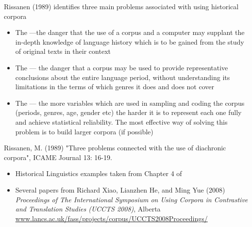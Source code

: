 \documentclass[a4paper,landscape,headrule,footrule,dvips]{foils}
\begin{document}
\begin{CJK}{UTF8}{min}
\MyLogo{}
Rissanen (1989) identifies three main problems associated with using historical corpora
\begin{itemize}
\item The  ---the danger that the use of a corpus and a computer may supplant the in-depth knowledge of language history which is to be gained from the study of original texts in their context
\item  The  --- the danger that a corpus may be used to provide representative conclusions about the entire language period, without understanding its limitations in the terms of which genres it does and does not cover
\item The  --- the more variables which are used in sampling and coding the corpus (periods, genres, age, gender etc) the harder it is to represent each one fully and achieve statistical reliability. The most effective way of solving this problem is to build larger corpora (if possible)
\end{itemize}

Rissanen, M. (1989) "Three problems connected with the use of
diachronic corpora", ICAME Journal 13: 16-19.


 \begin{itemize}
 \item Historical Linguistics examples taken from Chapter 4 of
 \item Several papers from Richard Xiao, Lianzhen He, and Ming Yue
   (2008) \textit{Proceedings of The International Symposium on Using
     Corpora in Contrastive and Translation Studies (UCCTS 2008)}, Alberta
\\ \url{www.lancs.ac.uk/fass/projects/corpus/UCCTS2008Proceedings/}
 \end{itemize}


\end{CJK}
\end{document}

